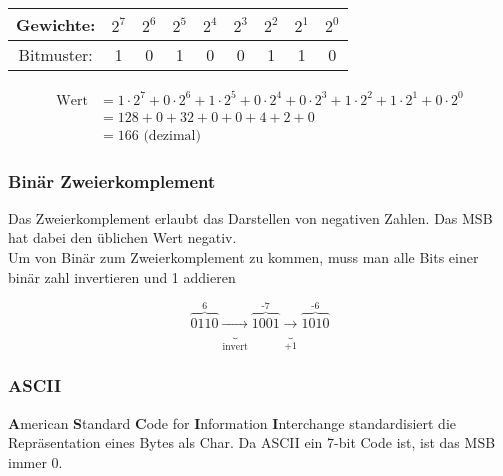 \noindent
\begin{tabular}{|c|c|c|c|c|c|c|c|c|}
\hline
Gewichte: & \(2^7\) & \(2^6\) & \(2^5\) & \(2^4\) & \(2^3\) & \(2^2\) & \(2^1\) & \(2^0\) \\
\hline
Bitmuster: & 1 & 0 & 1 & 0 & 0 & 1 & 1 & 0 \\
\hline
\end{tabular}

\[
\begin{aligned}
\text{Wert} &= 1 \cdot 2^7+0 \cdot 2^6+1 \cdot 2^5+0 \cdot 2^4+0 \cdot 2^3+1 \cdot 2^2+1 \cdot 2^1+0 \cdot 2^0 \\
&= 128 + 0 + 32 + 0 + 0 + 4 + 2 + 0 \\
&= 166 \text{ (dezimal)}
\end{aligned}
\]

\subsubsection{Binär Zweierkomplement}

Das Zweierkomplement erlaubt das Darstellen von negativen Zahlen. Das MSB hat dabei den üblichen Wert negativ.\\ 
Um von Binär zum Zweierkomplement zu kommen, muss man alle Bits einer binär zahl invertieren und 1 addieren

\[
\overbrace{0110}^\text{6} 
\underbrace{\rightarrow}_\text{invert}
\overbrace{1001}^\text{-7} 
\underbrace{\rightarrow}_{+1}
\overbrace{1010}^\text{-6} 
\]
\subsubsection{ASCII}

\textbf{A}merican \textbf{S}tandard \textbf{C}ode for \textbf{I}nformation \textbf{I}nterchange standardisiert die Repräsentation eines Bytes als Char. 
Da ASCII ein 7-bit Code ist, ist das MSB immer 0.\\

